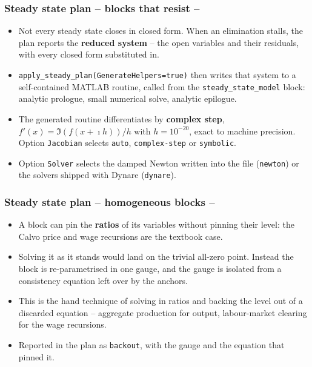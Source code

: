 \documentclass[10pt,slidestop]{beamer}
\theoremstyle{plain}
\begin{document}
\begin{frame}[c,fragile]
  \frametitle{Steady state plan -- blocks that resist --}

  \begin{itemize}

  \item Not every steady state closes in closed form. When an elimination
    stalls, the plan reports the \textbf{reduced system} -- the open variables
    and their residuals, with every closed form substituted in.\newline

  \item \verb+apply_steady_plan(GenerateHelpers=true)+ then writes that system
    to a self-contained MATLAB routine, called from the
    \verb+steady_state_model+ block: analytic prologue, small numerical solve,
    analytic epilogue.\newline

  \item The generated routine differentiates by \textbf{complex step},
    $f'(x)=\Im\left(f(x+\imath h)\right)/h$ with $h=10^{-20}$, exact to machine
    precision. Option \verb+Jacobian+ selects \verb+auto+, \verb+complex-step+
    or \verb+symbolic+.\newline

  \item Option \verb+Solver+ selects the damped Newton written into the file
    (\verb+newton+) or the solvers shipped with Dynare (\verb+dynare+).

  \end{itemize}

\end{frame}


\begin{frame}[c,fragile]
  \frametitle{Steady state plan -- homogeneous blocks --}

  \begin{itemize}

  \item A block can pin the \textbf{ratios} of its variables without pinning
    their level: the Calvo price and wage recursions are the textbook case.\newline

  \item Solving it as it stands would land on the trivial all-zero point.
    Instead the block is re-parametrised in one gauge, and the gauge is isolated
    from a consistency equation left over by the anchors.\newline

  \item This is the hand technique of solving in ratios and backing the level
    out of a discarded equation -- aggregate production for output,
    labour-market clearing for the wage recursions.\newline

  \item Reported in the plan as \verb+backout+, with the gauge and the equation
    that pinned it.

  \end{itemize}

\end{frame}
\end{document}
